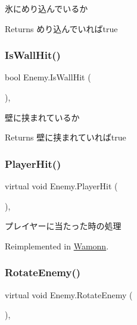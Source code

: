 氷にめり込んでいるか 

\begin{DoxyReturn}{Returns}
めり込んでいればtrue
\end{DoxyReturn}
\mbox{\label{class_enemy_a058914a6e2dd7d3d898c2b8bfcc7fa70}} 
\subsubsection{\texorpdfstring{Is\+Wall\+Hit()}{IsWallHit()}}
{\footnotesize\ttfamily bool Enemy.\+Is\+Wall\+Hit (\begin{DoxyParamCaption}{ }\end{DoxyParamCaption})\hspace{0.3cm}{\ttfamily [inline]}, {\ttfamily [protected]}}



壁に挟まれているか 

\begin{DoxyReturn}{Returns}
壁に挟まれていればtrue
\end{DoxyReturn}
\mbox{\label{class_enemy_a2b5e9b4644bd49c33279403c6477ed39}} 
\subsubsection{\texorpdfstring{Player\+Hit()}{PlayerHit()}}
{\footnotesize\ttfamily virtual void Enemy.\+Player\+Hit (\begin{DoxyParamCaption}{ }\end{DoxyParamCaption})\hspace{0.3cm}{\ttfamily [inline]}, {\ttfamily [virtual]}}



プレイヤーに当たった時の処理 



Reimplemented in \hyperlink{class_wamonn_a46080369edebc97e39e1841b91258856}{Wamonn}.

\mbox{\label{class_enemy_a2a0e665070fd362bd3ab2f2962ebff93}} 
\subsubsection{\texorpdfstring{Rotate\+Enemy()}{RotateEnemy()}}
{\footnotesize\ttfamily virtual void Enemy.\+Rotate\+Enemy (\begin{DoxyParamCaption}{ }\end{DoxyParamCaption})\hspace{0.3cm}{\ttfamily [inline]}, {\ttfamily [virtual]}}



